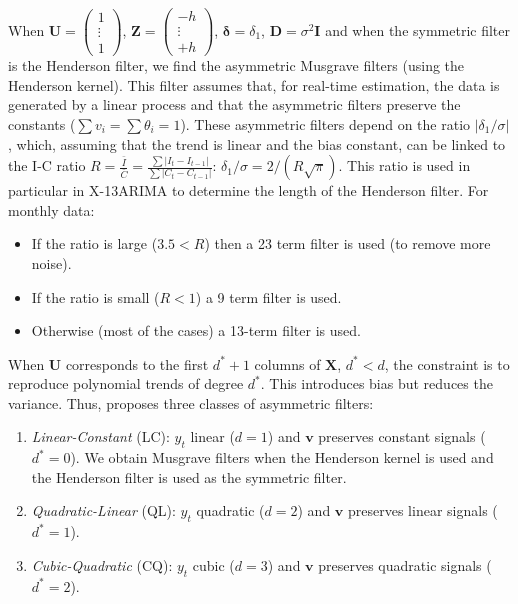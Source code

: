 \documentclass[
]{article}
\newcommand\1{\mathds{1}}
\begin{document}
When \(\boldsymbol U=\begin{pmatrix}1\\\vdots\\1\end{pmatrix}\),
\(\boldsymbol Z=\begin{pmatrix}-h\\\vdots\\+h\end{pmatrix}\),
\(\boldsymbol \delta=\delta_1\), \(\boldsymbol D=\sigma^2\boldsymbol I\)
and when the symmetric filter is the Henderson filter, we find the
asymmetric Musgrave filters (using the Henderson kernel). This filter
assumes that, for real-time estimation, the data is generated by a
linear process and that the asymmetric filters preserve the constants
(\(\sum v_i=\sum \theta_i=1\)). These asymmetric filters depend on the
ratio \(\lvert\delta_1/\sigma\rvert\), which, assuming that the trend is
linear and the bias constant, can be linked to the I-C ratio
\(R=\frac{\bar{I}}{\bar{C}}=\frac{\sum\lvert I_t-I_{t-1}\rvert}{\sum\lvert C_t-C_{t-1}\rvert}\):
\(\delta_1/\sigma=2/(R\sqrt{\pi})\). This ratio is used in particular in
X-13ARIMA to determine the length of the Henderson filter. For monthly
data:

\begin{itemize}
\item
  If the ratio is large (\(3.5< R\)) then a 23 term filter is used (to
  remove more noise).
\item
  If the ratio is small (\(R<1\)) a 9 term filter is used.
\item
  Otherwise (most of the cases) a 13-term filter is used.
\end{itemize}

When \(\boldsymbol U\) corresponds to the first \(d^*+1\) columns of
\(\boldsymbol X\), \(d^*<d\), the constraint is to reproduce polynomial
trends of degree \(d^*\). This introduces bias but reduces the variance.
Thus, \textcite{proietti2008} proposes three classes of asymmetric
filters:

\begin{enumerate}
\def\labelenumi{\arabic{enumi}.}
\item
  \emph{Linear-Constant} (LC): \(y_t\) linear (\(d=1\)) and
  \(\boldsymbol v\) preserves constant signals (\(d^*=0\)). We obtain
  Musgrave filters when the Henderson kernel is used and the Henderson
  filter is used as the symmetric filter.
\item
  \emph{Quadratic-Linear} (QL): \(y_t\) quadratic (\(d=2\)) and
  \(\boldsymbol v\) preserves linear signals (\(d^*=1\)).
\item
  \emph{Cubic-Quadratic} (CQ): \(y_t\) cubic (\(d=3\)) and
  \(\boldsymbol v\) preserves quadratic signals (\(d^*=2\)).
\end{enumerate}
\end{document}
